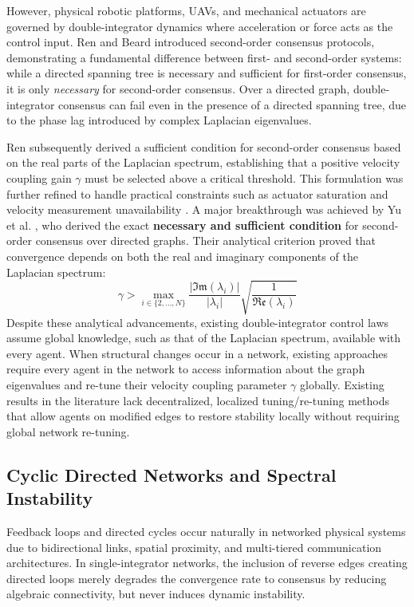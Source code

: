 However, physical robotic platforms, UAVs, and mechanical actuators are governed by double-integrator dynamics where acceleration or force acts as the control input. Ren and Beard \cite{ren2005second} introduced second-order consensus protocols, demonstrating a fundamental difference between first- and second-order systems: while a directed spanning tree is necessary and sufficient for first-order consensus, it is only \emph{ necessary} for second-order consensus. Over a directed graph, double-integrator consensus can fail even in the presence of a directed spanning tree, due to the phase lag introduced by complex Laplacian eigenvalues.

Ren \cite{ren2008consensus} subsequently derived a sufficient condition for second-order consensus based on the real parts of the Laplacian spectrum, establishing that a positive velocity coupling gain $\gamma$ must be selected above a critical threshold. This formulation was further refined to handle practical constraints such as actuator saturation and velocity measurement unavailability \cite{ren2008consensus}. A major breakthrough was achieved by Yu et al. \cite{yu2010some}, who derived the exact \textbf{necessary and sufficient condition} for second-order consensus over directed graphs. Their analytical criterion proved that convergence depends on both the real and imaginary components of the Laplacian spectrum:
\begin{equation}\label{eq:ch1_nec_suf}
    \gamma > \max_{i \in \{2, \dots, N\}} \frac{|\mathfrak{Im}(\lambda_i)|}{|\lambda_i|} \sqrt{\frac{1}{\mathfrak{Re}(\lambda_i)}}
\end{equation}
Despite these analytical advancements, existing double-integrator control laws assume global knowledge, such as that of the Laplacian spectrum, available with every agent. When structural changes occur in a network, existing approaches require every agent in the network to access information about the graph eigenvalues and re-tune their velocity coupling parameter $\gamma$ globally. Existing results in the literature lack decentralized, localized tuning/re-tuning methods that allow agents on modified edges to restore stability locally without requiring global network re-tuning.

\subsection{Cyclic Directed Networks and Spectral Instability}
Feedback loops and directed cycles occur naturally in networked physical systems due to bidirectional links, spatial proximity, and multi-tiered communication architectures. In single-integrator networks, the inclusion of reverse edges creating directed loops merely degrades the convergence rate to consensus by reducing algebraic connectivity, but never induces dynamic instability. 

